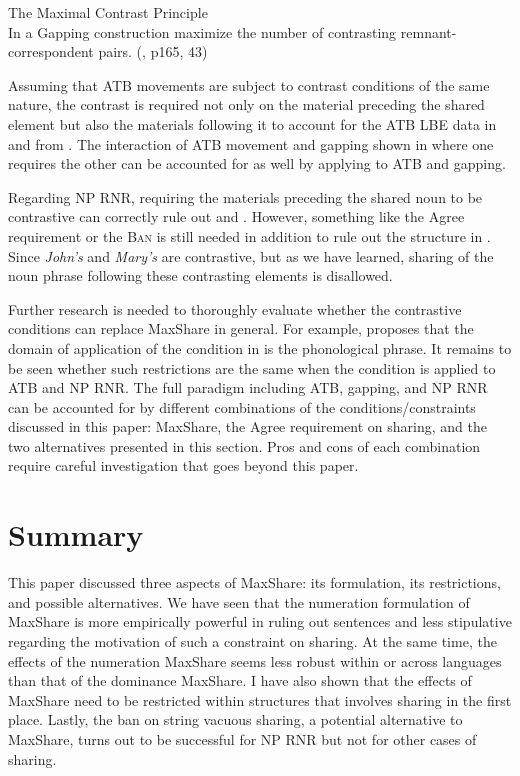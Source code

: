 \documentclass[output=paper]{langscibook}
\begin{document}
\ea 
	\label{shenMCP}
	The Maximal Contrast Principle\\
	In a Gapping construction maximize the number of contrasting remnant-correspondent pairs. (\citealt{Hartmann:2000}, p165, 43)
	\z 


Assuming that ATB movements are subject to contrast conditions of the same nature, the contrast is required not only on the material preceding the shared element but also the materials following it to account for the ATB LBE data in  and  from \citet{Citko:2006}. The interaction of ATB movement and gapping shown in  where one requires the other can be accounted for as well by applying  to ATB and gapping. 

Regarding NP RNR, requiring the materials preceding the shared noun to be contrastive can correctly rule out  and . However, something like the Agree requirement or the \textsc{Ban} is still needed in addition to rule out the structure in . Since \textit{John's} and \textit{Mary's} are contrastive, but as we have learned, sharing of the noun phrase following these contrasting elements is disallowed. 

Further research is needed to thoroughly evaluate whether the contrastive conditions can replace MaxShare in general. For example, \citet{Hartmann:2000} proposes that the domain of application of the condition in  is the phonological phrase. It remains to be seen whether such restrictions are the same when the condition is applied to ATB and NP RNR.  The full paradigm including ATB, gapping, and NP RNR can be accounted for by different combinations of the conditions/constraints discussed in this paper: MaxShare, the Agree requirement on sharing, and the two alternatives presented in this section. Pros and cons of each combination require careful investigation that goes beyond this paper.

\section{Summary}
\label{shensect:summary}

This paper discussed three aspects of MaxShare: its formulation, its restrictions, and possible alternatives. We have seen that the numeration formulation of MaxShare is more empirically powerful in ruling out sentences and less stipulative regarding the motivation of such a constraint on sharing. At the same time, the effects of the numeration MaxShare seems less robust within or across languages than that of the dominance MaxShare. I have also shown that the effects of MaxShare need to be restricted within structures that involves sharing in the first place. Lastly, the ban on string vacuous sharing, a potential alternative to MaxShare, turns out to be successful for NP RNR but not for other cases of sharing. 
\end{document}
